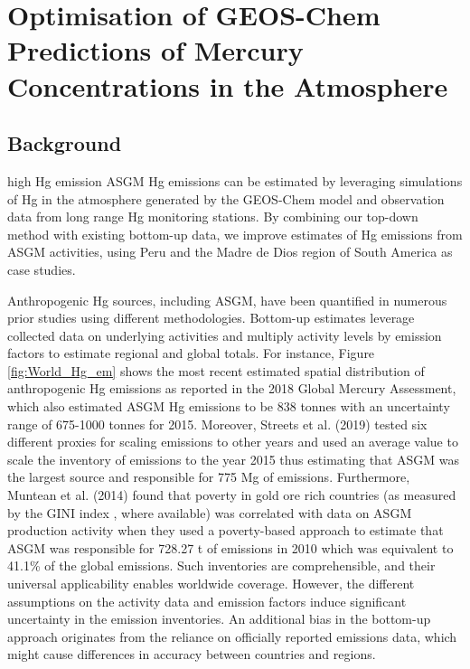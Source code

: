 \chapter{Optimisation of GEOS-Chem Predictions of Mercury Concentrations in the Atmosphere}
\section{Background}

high Hg emission ASGM Hg emissions can be estimated by leveraging simulations of Hg in the atmosphere generated by the GEOS-Chem model and observation data from long range Hg monitoring stations. By combining our top-down method with existing bottom-up data, we improve estimates of Hg emissions from ASGM activities, using Peru and the Madre de Dios region of South America as case studies.

Anthropogenic Hg sources, including ASGM, have been quantified in numerous prior studies using different methodologies. Bottom-up estimates leverage collected data on underlying activities and multiply activity levels by emission factors to estimate regional and global totals. For instance, Figure \ref{fig:World_Hg_em} shows the most recent estimated spatial distribution of anthropogenic Hg emissions as reported in the 2018 Global Mercury Assessment, which also estimated ASGM Hg emissions to be 838 tonnes with an uncertainty range of 675-1000 tonnes for 2015\cite{united_nations_environment_programme_technical_2019}. Moreover, Streets et al. (2019) tested six different proxies for scaling emissions to other years and used an average value to scale the inventory of emissions to the year 2015 thus estimating that ASGM was the largest source and responsible for 775 Mg of emissions\cite{streets_global_2019}. Furthermore, Muntean et al. (2014) found that poverty in  gold ore rich countries (as measured by the GINI index \cite{sadefo_kamdem_nice_2012}, where available) was correlated with data on ASGM production activity when they used a poverty-based approach to estimate that ASGM was responsible for 728.27 t of emissions in 2010 which was equivalent to 41.1\% of the global emissions\cite{muntean_evaluating_2018}. Such inventories are comprehensible, and their universal applicability enables worldwide coverage. However, the different assumptions on the activity data and emission factors induce significant uncertainty in the emission inventories. An additional bias in the bottom-up approach originates from the reliance on officially reported emissions data, which might cause differences in accuracy between countries and regions.

